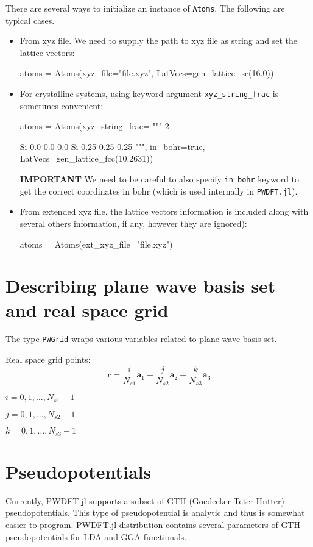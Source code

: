 \documentclass[a4paper,10pt]{article}
\newcommand{\jlinline}[1]{\texttt{#1}}
\begin{document}
There are several ways to initialize an instance of \jlinline{Atoms}. The following
are typical cases.
%
\begin{itemize}
%
\item From xyz file. We need to supply the path to xyz file as string and
set the lattice vectors:
%
\begin{juliacode}
atoms = Atoms(xyz_file="file.xyz", LatVecs=gen_lattice_sc(16.0))
\end{juliacode}
%
\item For crystalline systems, using keyword argument \jlinline{xyz_string_frac}
is sometimes convenient:
%
\begin{juliacode}
atoms = Atoms(xyz_string_frac=
        """
        2

        Si  0.0  0.0  0.0
        Si  0.25  0.25  0.25
        """, in_bohr=true,
        LatVecs=gen_lattice_fcc(10.2631))
\end{juliacode}
%
\textbf{IMPORTANT} We need to be careful to also specify \jlinline{in_bohr} keyword to get
the correct coordinates in bohr (which is used internally in \jlinline{PWDFT.jl}).
%
\item From extended xyz file, the lattice vectors information is included
along with several others information, if any, however they are ignored):
%
\begin{juliacode}
atoms = Atoms(ext_xyz_file="file.xyz")
\end{juliacode}
%
\end{itemize}


\section{Describing plane wave basis set and real space grid}

The type \jlinline{PWGrid} wraps various variables related to plane wave basis
set.

Real space grid points:
$$
\mathbf{r} = \frac{i}{N_{s1}}\mathbf{a}_{1} + \frac{j}{N_{s2}}\mathbf{a}_{2} +
\frac{k}{N_{s3}}\mathbf{a}_{3}
$$

$i = 0,1,\ldots,N_{s1}-1$

$j = 0,1,\ldots,N_{s2}-1$

$k = 0,1,\ldots,N_{s3}-1$


\section{Pseudopotentials}
%
Currently, \textsf{PWDFT.jl} supports a subset of GTH (Goedecker-Teter-Hutter)
pseudopotentials. This type of pseudopotential is analytic and thus is somewhat
easier to program.
%
\textsf{PWDFT.jl} distribution contains several parameters
of GTH pseudopotentials for LDA and GGA functionals.
\end{document}
